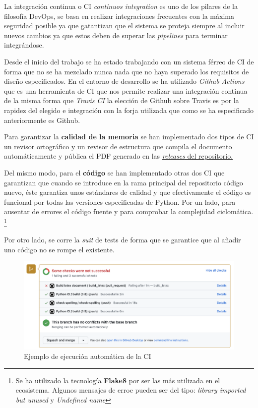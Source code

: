 La integración continua o CI \textit{continuos integration} es uno de los pilares de la
filosofía DevOps, se basa en realizar integraciones frecuentes con la máxima seguridad
posible ya que gatantizan que el sistema se proteja siempre al incluir nuevos cambios ya
que estos deben de superar las \textit{pipelines} para terminar integrándose. 

Desde el inicio del trabajo se ha estado trabajando con un sistema férreo de CI de forma
que no se ha mezclado nunca nada que no haya superado los requisitos de diseño
especificados. En el entorno de desarrollo se ha utilizado \textit{Github Actions} que es
una herramienta de CI que nos permite realizar una integración continua de la misma forma
que \textit{Travis CI} la elección de Github sobre Travis es por la rapidez del elegido e
integración con la forja utilizada que como se ha especificado anteriormente es Github.

Para garantizar la \textbf{calidad de la memoria} se han implementado dos tipos de CI\: un
revisor ortográfico y un revisor de estructura que compila el documento automáticamente y
pública el PDF generado en las
\href{https://github.com/pablojjimenez/TFG/releases}{\textit{releases} del repositorio.}

Del mismo modo, para el \textbf{código} se han implementado otras dos CI que garantizan
que cuando se introduce en la rama principal del repositorio código nuevo, éste garantiza
unos estándares de calidad y que efectivamente el código es funcional por todas las
versiones especificadas de Python. Por un lado, para ausentar de errores el código fuente
y para comprobar la complejidad ciclomática. \footnote{Se ha utilizado la tecnología
\textbf{Flake8} por ser las más utilizada en el ecosistema. Algunos mensajes de erroe
pueden ser del tipo: \textit{library imported but unused} y \textit{Undefined name} } 

Por otro lado, se corre la \textit{suit} de tests de forma que se garantice que al añadir
uno código no se rompe el existente. 

\FloatBarrier
\begin{figure}[h]
	\centering	
	\includegraphics[width=\textwidth]{doc/logos/imgs/CI-pr.png}
    \caption{Ejemplo de ejecución automática de la CI}
    \label{fig:tipos-de-cc}
\end{figure}
\FloatBarrier

